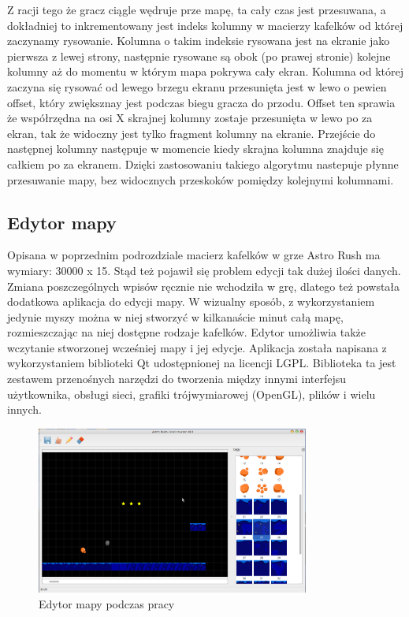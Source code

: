 Z racji tego że gracz ciągle wędruje prze mapę, ta cały czas jest przesuwana, a dokładniej  to inkrementowany jest indeks kolumny w macierzy kafelków od której zaczynamy rysowanie. Kolumna o takim indeksie rysowana jest na ekranie jako pierwsza z lewej strony, następnie rysowane są obok (po prawej stronie) kolejne kolumny aż do momentu w którym mapa pokrywa cały ekran.
Kolumna od której zaczyna się rysować od lewego brzegu ekranu przesunięta jest w lewo o pewien offset, który zwiększnay jest podczas biegu gracza do przodu. Offset ten sprawia że współrzędna na osi X skrajnej kolumny zostaje przesunięta w lewo po za ekran, tak że widoczny jest tylko fragment kolumny na ekranie. Przejście do następnej kolumny następuje w momencie kiedy skrajna kolumna znajduje się całkiem po za ekranem. Dzięki zastosowaniu takiego algorytmu nastepuje płynne przesuwanie mapy, bez widocznych przeskoków pomiędzy kolejnymi kolumnami.
 

\subsection{Edytor mapy}
Opisana w poprzednim podrozdziale macierz kafelków w grze Astro Rush ma wymiary: 30000 x 15. Stąd też pojawił się problem edycji tak dużej ilości danych. Zmiana poszczególnych wpisów ręcznie nie wchodziła w grę, dlatego też powstała dodatkowa aplikacja do edycji mapy. W wizualny sposób, z wykorzystaniem jedynie myszy można w niej stworzyć w kilkanaście minut całą mapę, rozmieszczając na niej dostępne rodzaje kafelków. Edytor umożliwia także wczytanie stworzonej wcześniej mapy i jej edycje. Aplikacja została napisana z wykorzystaniem biblioteki Qt udostępnionej na licencji LGPL. Biblioteka ta jest zestawem przenośnych narzędzi do tworzenia między innymi interfejsu użytkownika, obsługi sieci, grafiki trójwymiarowej (OpenGL), plików i wielu innych. 


\begin{figure}[h]
    \centering
    \includegraphics[width=0.8\textwidth,natwidth=800,natheight=142]{./Pictures/designer.png}
    \caption{Edytor mapy podczas pracy}
\end{figure}

